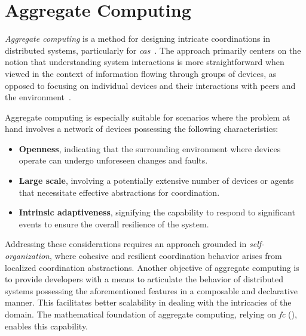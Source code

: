 \begin{figure}
    \centering
    \begin{subfigure}[b]{\textwidth}
        \centering
        
    \end{subfigure}
    \hfill
    \begin{subfigure}[b]{\textwidth}
        \centering
        
    \end{subfigure}
\end{figure}

\section{Aggregate Computing}
\label{section:aggregate-computing}

\textit{Aggregate computing} is a method for designing intricate coordinations in distributed systems, particularly for \textit{\ac{cas}}~\cite{Ferscha2015}. The approach primarily centers on the notion that understanding system interactions is more straightforward when viewed in the context of information flowing through groups of devices, as opposed to focusing on individual devices and their interactions with peers and the environment~\cite{Viroli2019}.

Aggregate computing is especially suitable for scenarios where the problem at hand involves a network of devices possessing the following characteristics:

\begin{itemize}
    \item \textbf{Openness}, indicating that the surrounding environment where devices operate can undergo unforeseen changes and faults.
    \item \textbf{Large scale}, involving a potentially extensive number of devices or agents that necessitate effective abstractions for coordination.
    \item \textbf{Intrinsic adaptiveness}, signifying the capability to respond to significant events to ensure the overall resilience of the system.
\end{itemize}

Addressing these considerations requires an approach grounded in \textit{self-organization}, where cohesive and resilient coordination behavior arises from localized coordination abstractions. Another objective of aggregate computing is to provide developers with a means to articulate the behavior of distributed systems possessing the aforementioned features in a composable and declarative manner. This facilitates better scalability in dealing with the intricacies of the domain. The mathematical foundation of aggregate computing, relying on \textit{\ac{fc}} (), enables this capability.

